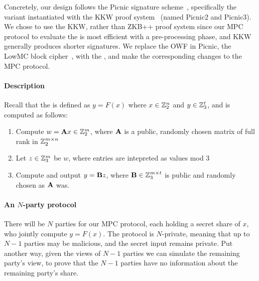 Concretely, our design follows the Picnic signature scheme~\cite{CCS:CDGORR17},
specifically the variant instantiated with the KKW proof
system~\cite{CCS:KatKolWan18} (named Picnic2 and Picnic3).  We chose to use the
KKW, rather than ZKB++ proof system since our MPC protocol to evaluate the
\ttOWF is most efficient with a pre-processing phase, and KKW generally
produces shorter signatures.  We replace the OWF in Picnic, the LowMC block cipher~\cite{EC:ARSTZ15}, 
with the \ttOWF, and make the corresponding changes to the MPC protocol. 


\paragraph{\ttOWF Description}
Recall that the \ttOWF is defined as $y = F(x)$ where $x \in \mathbb{Z}_2^{n}$ and $y\in \mathbb{Z}_3^{t}$, and is computed as follows: 
\begin{enumerate}
\item Compute $w = \mathbf{A} x \in \mathbb{Z}_2^{m}$, where $\mathbf{A}$ is a public, randomly chosen matrix of full rank in $\mathbb{Z}_2^{m\times n}$
\item Let $z\in\mathbb{Z}_3^{m}$ be $w$, where entries are intepreted as values mod 3
\item Compute and output $y = \mathbf{B} z$, where $\mathbf{B} \in \mathbb{Z}_3^{m\times t}$ is public and randomly chosen as $\mathbf{A}$ was. 
\end{enumerate}


\paragraph{An $N$-party protocol}
There will be $N$ parties for our MPC protocol, each holding a secret share of
$x$, who jointly compute $y = F(x)$.  The protocol is $N$-private, meaning that
up to $N-1$ parties may be malicious, and the secret input remains private.
Put another way, given the views of $N-1$ parties we can simulate the remaining
party's view, to prove that the $N-1$ parties have no information about the
remaining party's share. 

